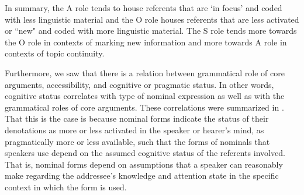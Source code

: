In summary, the A role tends to house referents that are `in focus' \citep{gundel1993} and coded with less linguistic material and the O role houses referents that are less activated or ``new" and coded with more linguistic material. The S role tends more towards the O role in contexts of marking new information and more towards A role in contexts of topic continuity.

Furthermore, we saw that there is a relation between grammatical role of core arguments, accessibility, and cognitive or pragmatic status. In other words, cognitive status correlates with type of nominal expression as well as with the grammatical roles of core arguments. These correlations were summarized in . That this is the case is because nominal forms indicate the status of their denotations as more or less activated in the speaker or hearer's mind, as pragmatically more or less available, such that the forms of nominals that speakers use depend on the assumed cognitive status of the referents involved. That is, nominal forms depend on assumptions that a speaker can reasonably make regarding the addressee's knowledge and attention state in the specific context in which the form is used. 


